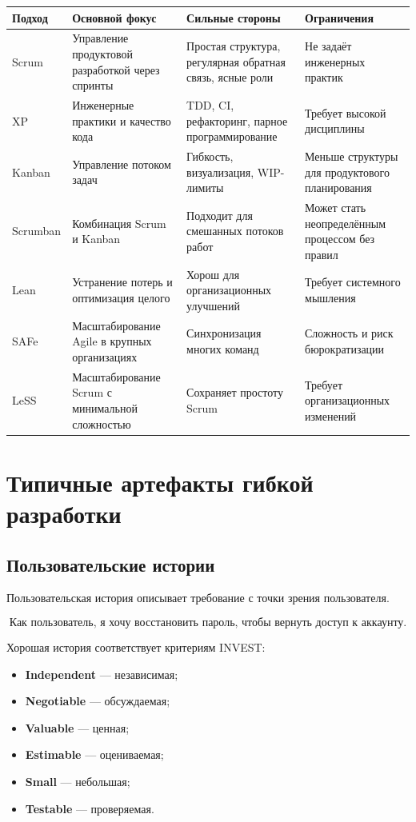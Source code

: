 \documentclass[12pt,a4paper]{article}
\begin{document}
\begin{longtable}{p{3cm}p{4cm}p{4cm}p{4cm}}
\toprule
\textbf{Подход} & \textbf{Основной фокус} & \textbf{Сильные стороны} & \textbf{Ограничения} \\
\midrule
Scrum & Управление продуктовой разработкой через спринты & Простая структура, регулярная обратная связь, ясные роли & Не задаёт инженерных практик \\
\midrule
XP & Инженерные практики и качество кода & TDD, CI, рефакторинг, парное программирование & Требует высокой дисциплины \\
\midrule
Kanban & Управление потоком задач & Гибкость, визуализация, WIP-лимиты & Меньше структуры для продуктового планирования \\
\midrule
Scrumban & Комбинация Scrum и Kanban & Подходит для смешанных потоков работ & Может стать неопределённым процессом без правил \\
\midrule
Lean & Устранение потерь и оптимизация целого & Хорош для организационных улучшений & Требует системного мышления \\
\midrule
SAFe & Масштабирование Agile в крупных организациях & Синхронизация многих команд & Сложность и риск бюрократизации \\
\midrule
LeSS & Масштабирование Scrum с минимальной сложностью & Сохраняет простоту Scrum & Требует организационных изменений \\
\bottomrule
\end{longtable}

\section{Типичные артефакты гибкой разработки}

\subsection{Пользовательские истории}

Пользовательская история описывает требование с точки зрения пользователя.

\[
\text{Как пользователь, я хочу восстановить пароль, чтобы вернуть доступ к аккаунту.}
\]

Хорошая история соответствует критериям INVEST:
\begin{itemize}
    \item \textbf{Independent} --- независимая;
    \item \textbf{Negotiable} --- обсуждаемая;
    \item \textbf{Valuable} --- ценная;
    \item \textbf{Estimable} --- оцениваемая;
    \item \textbf{Small} --- небольшая;
    \item \textbf{Testable} --- проверяемая.
\end{itemize}
\end{document}
